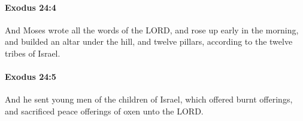 		\paragraph{Exodus 24:4} %
			\label{EXODUS-24-4}

			And Moses wrote all the words of the LORD, and rose up early in the morning, and builded an altar under the hill, and twelve pillars, according to the twelve tribes of Israel.


		\paragraph{Exodus 24:5} %
			\label{EXODUS-24-5}

			And he sent young men of the children of Israel, which offered burnt offerings, and sacrificed peace offerings of oxen unto the LORD.


